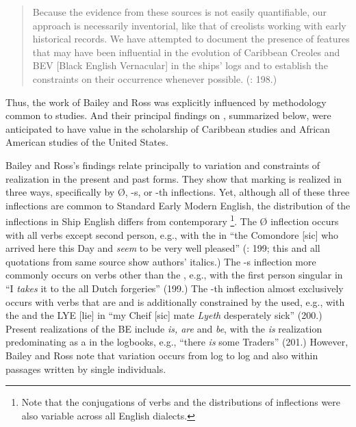 \begin{quotation}
Because the evidence from these sources is not easily quantifiable, our approach is necessarily inventorial, like that of creolists working with early historical records. We have attempted to document the presence of features that may have been influential in the evolution of Caribbean Creoles and BEV [Black English Vernacular] in the ships’ logs and to establish the constraints on their occurrence whenever possible. (\citealt{BaileyRoss1988}: 198.) \end{quotation}

Thus, the work of Bailey and Ross was explicitly influenced by methodology common to  studies. And their principal findings on  , summarized below, were anticipated to have value in the scholarship of Caribbean  studies and African American  studies of the United States.

Bailey and Ross’s findings relate principally to variation and constraints of   realization in the present and past  forms. They show that  marking is realized in three ways, specifically by Ø, -s, or -th inflections. Yet, although all of these three inflections are common to Standard Early Modern English, the distribution of the inflections in Ship English differs from contemporary \footnote{Note that the conjugations of verbs and the distributions of inflections were also variable across all English dialects.}. The Ø inflection occurs with all verbs except second person, e.g., with the  in “the Comondore [sic] who arrived here this Day and \textit{seem} to be very well pleased” (\citealt{BaileyRoss1988}: 199; this and all quotations from same source show authors’ italics.) The -s inflection more commonly occurs on verbs other than the , e.g., with the first person singular in “I \textit{takes} it to the all Dutch forgeries” (199.) The -th inflection almost exclusively occurs with verbs that are  and is additionally constrained by the  used, e.g., with the  and the  LYE [lie] in “my Cheif [sic] mate \textit{Lyeth} desperately sick” (200.) Present  realizations of the  BE include \textit{is, are} and \textit{be}, with the \textit{is} realization predominating as a  in the logbooks, e.g., “there \textit{is} some Traders” (201.) However, Bailey and Ross note that variation occurs from log to log and also within passages written by single individuals. 

